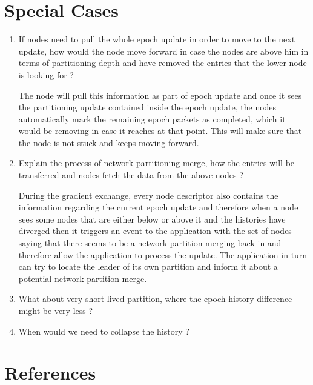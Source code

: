 \documentclass[a4paper, 11pt]{article}
\begin{document}
\section{Special Cases}


\begin{enumerate}

\item If nodes need to pull the whole epoch update in order to move to the next update, how would the node move forward in case the nodes are above him in terms of partitioning depth and have removed the entries that the lower node is looking for ?

The node will pull this information as part of epoch update and once it sees the partitioning update contained inside the epoch update, the nodes automatically mark the remaining epoch packets as completed, which it would be removing in case it reaches at that point. This will make sure that the node is not stuck and keeps moving forward.


\item Explain the process of network partitioning merge, how the entries will  be transferred and nodes fetch the data from the above nodes ?

During the gradient exchange, every node descriptor also contains the information regarding the current epoch update and therefore when a node sees some nodes that are either below or above it and the histories have diverged then it triggers an event to the application with the set of nodes saying that there seems to be a network partition merging back in and therefore allow the application to process the update. The application in turn can try to locate the leader of its own partition and inform it about a potential network partition merge.


\item What about very short lived partition, where the epoch history difference might be very less ?

\item When would we need to collapse the history ?

\end{enumerate}


\section{References}
\end{document}
